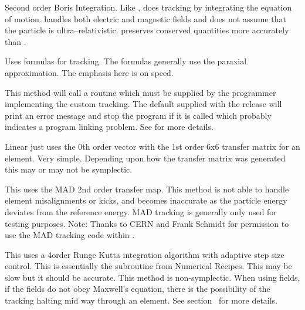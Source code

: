 \begin{description}

\item[\vn{Boris}]
Second order Boris Integration\cite{b:boris}. Like ,
 does tracking by integrating the equation of
motion.  handles both electric and magnetic fields and does
not assume that the particle is ultra--relativistic.  preserves
conserved quantities more accurately than .

\item[\vn{Bmad_Standard}]
Uses formulas for tracking. The formulas generally use the paraxial
approximation.  The emphasis here is on speed.

\item[\vn{Custom}]
This method will call a routine  which must be
supplied by the programmer implementing the custom tracking. The
default  supplied with the \bmad release will print
an error message and stop the program if it is called which probably
indicates a program linking problem. See  for more details.

\item[\vn{Linear}]
Linear just uses the 0th order vector with the 1st order 6x6 transfer
matrix for an element. Very simple.  Depending upon how the transfer
matrix was generated this may or may not be symplectic.

\item[\vn{MAD}]
This uses the MAD 2nd order transfer map. This method is not able to
handle element misalignments or kicks, and becomes inaccurate as the
particle energy deviates from the reference energy. MAD tracking is
generally only used for testing purposes. Note: Thanks to CERN and
Frank Schmidt for permission to use the MAD tracking code within
\bmad.

\item[\vn{runge_kutta}]
This uses a 4\Th order Runge Kutta integration algorithm with adaptive
step size control.  This is essentially the  subroutine
from Numerical Recipes\cite{b:nr}. This may be slow but it should be
accurate. This method is non-symplectic.  When using
 fields, if the fields do not obey Maxwell's equation,
there is the possibility of the  tracking halting mid
way through an element. See section~ for more details.


\end{description}
